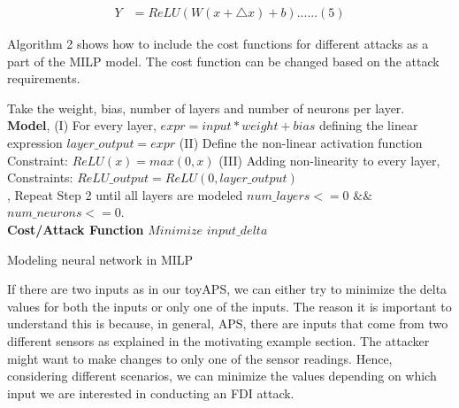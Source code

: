 \begin{align}
Y &=  ReLU(W(x + \bigtriangleup  x ) + b) ...... (5)
\end{align}

Algorithm 2 shows how to include the cost functions for different attacks as a part of the MILP model. The cost function can be changed based on the attack requirements. 
\begin{algorithm}
	Take the weight, bias, number of layers and number of neurons per layer. \\
	
	\textbf{Model}, \linebreak
	(I) For every  layer,  $expr = input * weight + bias$
	\linebreak 
	defining the linear expression
	\linebreak
	$layer\_output = expr$
	\linebreak
	(II) Define the non-linear activation function 
	\linebreak 
	\qquad Constraint: $ReLU(x) = max (0,x)$
	\linebreak
	(III) Adding non-linearity to every layer,
	\linebreak
	Constraints: $ReLU\_output = ReLU(0, layer\_output)$\\, 
	Repeat Step 2 until all layers are modeled 
	\linebreak
	$num\_layers < = 0$   $ \&\& $ 
	$ num\_neurons < = 0 $.\\
	
	\textbf{Cost/Attack Function} \linebreak
	$Minimize $  $input\_delta$
	\caption{Modeling neural network in MILP}
	\label{algo:b}
\end{algorithm}

If there are two inputs as in our toyAPS, we can either try to minimize the delta values for both the inputs or only one of the inputs. The reason it is important to understand this is because, in general, APS, there are inputs that come from two different sensors as explained in the motivating example section. %
The attacker might want to make changes to only one of the sensor readings. Hence, considering different scenarios, we can minimize the values depending on which input we are interested in conducting an FDI attack. 


